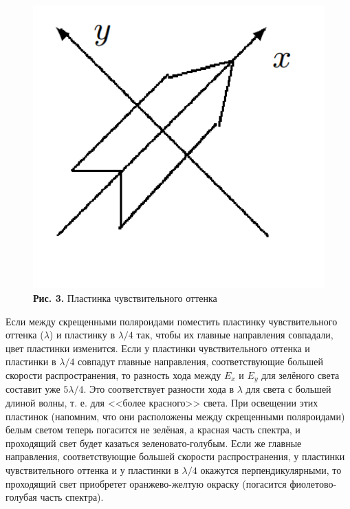\documentclass[a4paper,12pt]{article} %
\begin{document}
\begin{figure}
\begin{center}
    \includegraphics[width=1\textwidth]{4.7.3_3.png}
    \textbf{Рис. 3.} Пластинка чувствительного оттенка
\end{center}
\end{figure}

\hfill \break Если между скрещенными поляроидами поместить пластинку чувствительного оттенка ($ \lambda $) и пластинку в $ \lambda/4 $ так, чтобы их главные направления совпадали, цвет пластинки изменится. Если у пластинки чувствительного оттенка и пластинки в $ \lambda/4  $ совпадут главные направления, соответствующие большей скорости распространения, то разность хода между $ E_x $ и $ E_y $ для зелёного света составит уже $ 5\lambda/4 $. Это соответствует разности хода в $ \lambda $ для света с большей длиной волны, т. е. для <<более красного>> света. При освещении этих пластинок (напомним, что они расположены между скрещенными поляроидами) белым светом теперь погасится не зелёная, а красная часть спектра, и проходящий свет будет казаться зеленовато-голубым. Если же главные направления, соответствующие большей скорости распространения, у пластинки чувствительного оттенка и у пластинки в $ \lambda/4 $ окажутся перпендикулярными, то проходящий свет приобретет оранжево-желтую окраску (погасится фиолетово-голубая часть спектра).
\end{document}
